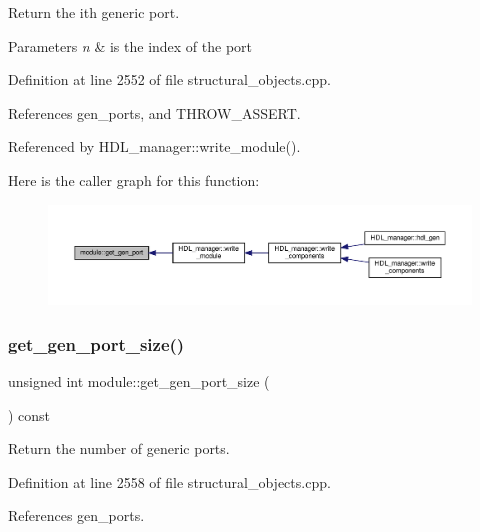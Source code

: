 Return the ith generic port. 


\begin{DoxyParams}{Parameters}
{\em n} & is the index of the port \\
\hline
\end{DoxyParams}


Definition at line 2552 of file structural\+\_\+objects.\+cpp.



References gen\+\_\+ports, and T\+H\+R\+O\+W\+\_\+\+A\+S\+S\+E\+RT.



Referenced by H\+D\+L\+\_\+manager\+::write\+\_\+module().

Here is the caller graph for this function\+:
\nopagebreak
\begin{figure}[H]
\begin{center}
\leavevmode
\includegraphics[width=350pt]{d0/dd3/classmodule_aa5c197d6bc4ebaac479f48b03cef4388_icgraph}
\end{center}
\end{figure}
\mbox{\label{classmodule_a5e09736fa2af5dd429e02ae2f90d389b}} 
\subsubsection{\texorpdfstring{get\+\_\+gen\+\_\+port\+\_\+size()}{get\_gen\_port\_size()}}
{\footnotesize\ttfamily unsigned int module\+::get\+\_\+gen\+\_\+port\+\_\+size (\begin{DoxyParamCaption}{ }\end{DoxyParamCaption}) const}



Return the number of generic ports. 



Definition at line 2558 of file structural\+\_\+objects.\+cpp.



References gen\+\_\+ports.



